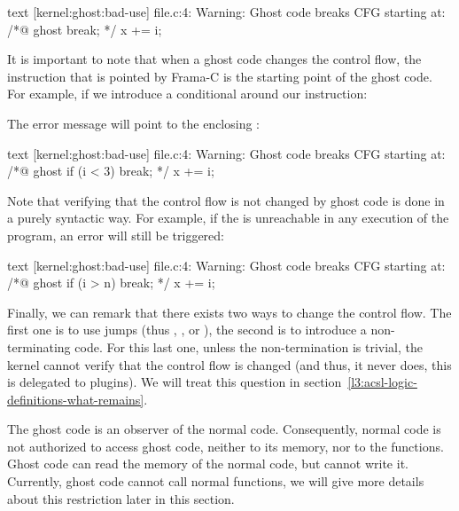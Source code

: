 \begin{CodeBlock}{text}
[kernel:ghost:bad-use] file.c:4: Warning:
  Ghost code breaks CFG starting at:
  /*@ ghost break; */
  x += i;
\end{CodeBlock}


It is important to note that when a ghost code changes the control
flow, the instruction that is pointed by Frama-C is the starting
point of the ghost code. For example, if we introduce a conditional
around our  instruction:




The error message will point to the enclosing :


\begin{CodeBlock}{text}
[kernel:ghost:bad-use] file.c:4: Warning:
  Ghost code breaks CFG starting at:
  /*@ ghost if (i < 3) break; */
  x += i;
\end{CodeBlock}


Note that verifying that the control flow is not changed by ghost
code is done in a purely syntactic way. For example, if the
 is unreachable in any execution of the program,
an error will still be triggered:




\begin{CodeBlock}{text}
[kernel:ghost:bad-use] file.c:4: Warning:
  Ghost code breaks CFG starting at:
  /*@ ghost if (i > n) break; */
  x += i;
\end{CodeBlock}


Finally, we can remark that there exists two ways to change the control
flow. The first one is to use jumps (thus ,
, or ), the second is to
introduce a non-terminating code. For this last one, unless the non-termination
is trivial, the kernel cannot verify that the control
flow is changed (and thus, it never does, this is delegated to plugins).
We will treat this question in
section~\ref{l3:acsl-logic-definitions-what-remains}.




The ghost code is an observer of the normal code. Consequently, normal
code is not authorized to access ghost code, neither to its memory,
nor to the functions. Ghost code can read the memory of the normal code,
but cannot write it. Currently, ghost code cannot call normal functions,
we will give more details about this restriction later in this section.


